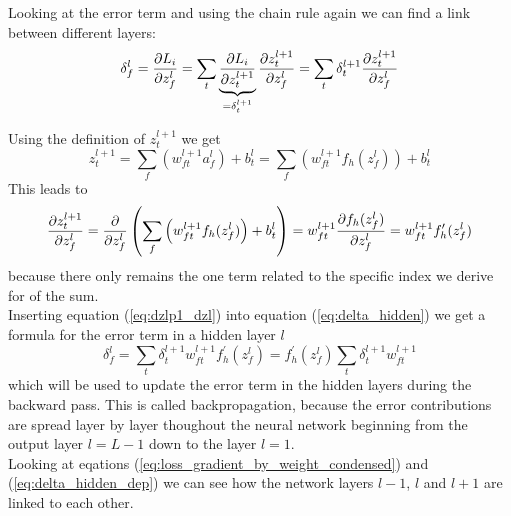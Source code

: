 Looking at the error term and using the chain rule again we can find a link between
different layers:
\begin{equation}
    \delta_f^l = \frac{\partial {L_i}}{\partial {z_f^l}}
    = \sum\limits_t \underbrace{\frac{\partial {L_i}}{\partial {z_t^{l+1}}}}_{= \delta_t^{l+1}} \frac{\partial {z_t^{l+1}}}{\partial {z_f^l}} 
    = \sum\limits_t \delta_t^{l+1} \frac{\partial {z_t^{l+1}}}{\partial {z_f^l}}
    \label{eq:delta_hidden}
\end{equation} 

Using the definition of $z_t^{l+1}$ we get
\begin{equation}
    z_t^{l+1} = \sum\limits_f \left( w_{ft}^{l+1} a_f^l \right) + b_t^l
    = \sum\limits_f \left( w_{ft}^{l+1} f_h( z_f^l ) \right) + b_t^l
\end{equation}
This leads to
\begin{equation}
    \frac{\partial {z_t^{l+1}}}{\partial {z_f^l}}
    = \frac{\partial {}}{\partial {z_f^l}} \left( \sum\limits_f \left( w_{ft}^{l+1} f_h( z_f^l ) \right) + b_t^l \right)
    = w_{ft}^{l+1} \frac{\partial {f_h( z_f^l )}}{\partial {z_f^l}}
    = w_{ft}^{l+1} f_h^\prime( z_f^l )
    \label{eq:dzlp1_dzl}
\end{equation}
because there only remains the one term related to the specific index we derive for of the
sum. \\

Inserting equation (\ref{eq:dzlp1_dzl}) into equation (\ref{eq:delta_hidden}) we get a
formula for the error term in a hidden layer $l$
\begin{equation}
    \delta_f^l = \sum\limits_t \delta_t^{l+1} w_{ft}^{l+1} f_h^\prime( z_f^l )
    = f_h^\prime( z_f^l ) \sum\limits_t \delta_t^{l+1} w_{ft}^{l+1}
    \label{eq:delta_hidden_dep}
\end{equation}
which will be used to update the error term in the hidden layers during the backward pass.
This is called backpropagation, because the error contributions are spread layer by layer
thoughout the neural network beginning from the output layer $l=L-1$ down to the layer
$l=1$. \\

Looking at eqations (\ref{eq:loss_gradient_by_weight_condensed}) and
(\ref{eq:delta_hidden_dep}) we can see how the network layers $l-1$, $l$ and $l+1$ are
linked to each other.

\newpage